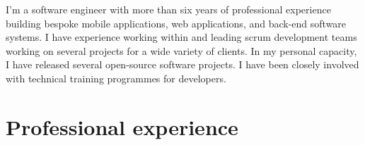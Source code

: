 \documentclass[11pt,a4paper,sans]{moderncv}
\begin{document}
\makecvtitle

\vspace{-20pt}

I'm a software engineer with more than six years of professional experience building bespoke mobile applications, web applications, and back-end software systems. I have experience working within and leading scrum development teams working on several projects for a wide variety of clients. In my personal capacity, I have released several open-source software projects. I have been closely involved with technical training programmes for developers.\\

\vspace{-4pt}

\section{Professional experience}

\vspace{4pt}
\end{document}
